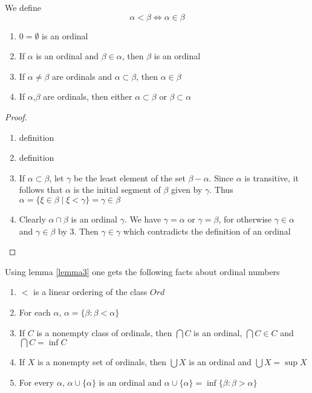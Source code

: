 \documentclass[11pt]{article}
\begin{document}
We define
\begin{equation*}
\alpha<\beta\Leftrightarrow\alpha\in\beta
\end{equation*}
\begin{lemma}[]
\label{lemma3}
\begin{enumerate}
\item \(0=\emptyset\) is an ordinal
\item If \(\alpha\) is an ordinal and \(\beta\in\alpha\), then \(\beta\) is an ordinal
\item If \(\alpha\neq\beta\) are ordinals and \(\alpha\subset\beta\), then
\(\alpha\in\beta\)
\item If \(\alpha\),\(\beta\) are ordinals, then either \(\alpha\subset\beta\) or
\(\beta\subset\alpha\)
\end{enumerate}
\end{lemma}
\begin{proof}
\begin{enumerate}
\item definition
\item definition
\item If \(\alpha\subset\beta\), let \(\gamma\) be the least element of the set
\(\beta-\alpha\). Since \(\alpha\) is transitive, it follows that \(\alpha\) is the
initial segment of \(\beta\) given by \(\gamma\). Thus
\(\alpha=\{\xi\in\beta\mid\xi<\gamma\}=\gamma\in\beta\)
\item Clearly \(\alpha\cap\beta\) is an ordinal \(\gamma\). We have \(\gamma=\alpha\) or
\(\gamma=\beta\), for otherwise \(\gamma\in\alpha\) and \(\gamma\in\beta\) by 3.
Then \(\gamma\in\gamma\) which contradicts the definition of an ordinal
\end{enumerate}
\end{proof}
Using lemma \ref{lemma3} one gets the following facts about ordinal numbers
\begin{enumerate}
\item \(<\) is a linear ordering of the class \(Ord\)
\item For each \(\alpha\), \(\alpha=\{\beta:\beta<\alpha\}\)
\item If \(C\) is a nonempty class of ordinals, then \(\bigcap C\) is an ordinal,
\(\bigcap C\in C\) and \(\bigcap C=\inf C\)
\item If \(X\) is a nonempty set of ordinals, then \(\bigcup X\) is an ordinal and
\(\bigcup X=\sup X\)
\item For every \(\alpha\), \(\alpha\cup\{\alpha\}\) is an ordinal and
\(\alpha\cup\{\alpha\}=\inf\{\beta:\beta>\alpha\}\)
\end{enumerate}
\end{document}

